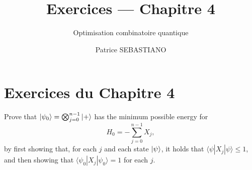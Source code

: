 \documentclass{ceri/sty/rapport}
\title{Exercices — Chapitre 4}
\subtitle{Optimisation combinatoire quantique}
\author{
	Patrice SEBASTIANO
}
\newcounter{exercice}[section]
\begin{document}
\maketitle
\sloppy


\section{Exercices du Chapitre 4}
\label{sec:chap4}

\begin{exercice}[p.~130]
Prove that $\ket{\psi_0} = \bigotimes_{j=0}^{n-1} \ket{+}$ has the minimum possible energy for
\[
  H_0 = -\sum_{j=0}^{n-1} X_j,
\]
by first showing that, for each $j$ and each state $\ket{\psi}$, it holds that
$\langle \psi | X_j | \psi \rangle \leq 1$, and then showing that
$\langle \psi_0 | X_j | \psi_0 \rangle = 1$ for each $j$.
\end{exercice}
\end{document}
